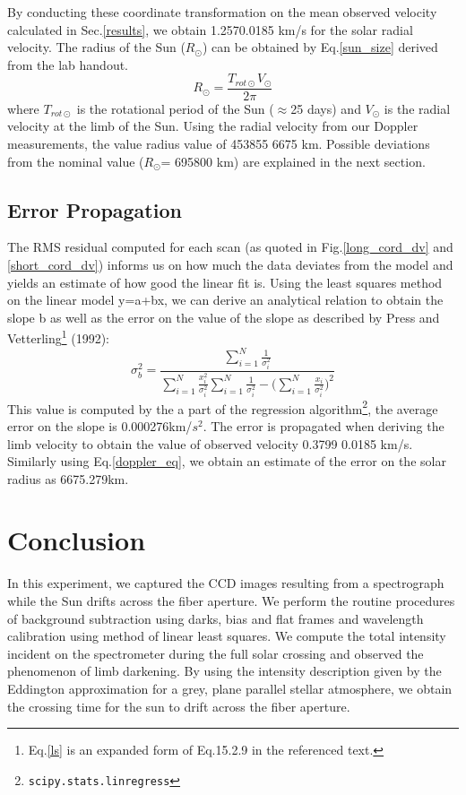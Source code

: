 \documentclass[authoryear, 12pt,5p, times]{elsarticle}
\newcommand{\rpm}{\raisebox{.3ex}{$\scriptstyle\pm$}}
\begin{document}
By conducting these coordinate transformation on the mean observed velocity calculated in Sec.\ref{results}, we obtain 1.257\rpm 0.0185 km/s for the solar radial velocity. The radius of the Sun ($R_{\odot}$) can be obtained by Eq.\ref{sun_size} derived from the lab handout.
\begin{equation}
R_{\odot} = \frac{T_{rot \odot} V_\odot}{2\pi}
\label{sun_size}
\end{equation}
where $T_{rot \odot}$ is the rotational period of the Sun ($\approx$25 days) and $V_\odot$ is the radial velocity at the limb of the Sun. Using the radial velocity from our Doppler measurements, the value radius value of 453855 \rpm 6675 km. Possible deviations from the nominal value ($R_\odot$= 695800 km) are explained in the next section.
\label{size_calc}
\subsection{Error Propagation}
The RMS residual computed for each scan (as quoted in Fig.\ref{long_cord_dv} and \ref{short_cord_dv}) informs us on how much the data  deviates from the model and yields an estimate of how good the linear fit is.  Using the least squares method on the linear model y=a+bx, we can derive an analytical relation to obtain the slope b as well as the error on the value of the slope as described by Press and Vetterling\footnote{Eq.\ref{ls} is an expanded form of  Eq.15.2.9 in the referenced text.}  (1992): 
\begin{equation}
\sigma_b^2 = \frac{\sum\limits_{i=1}^N\frac{1}{\sigma_i^2}}{\sum\limits_{i=1}^N\frac{x_i^2}{\sigma_i^2}\sum\limits_{i=1}^N\frac{1}{\sigma_i^2}-\Big(\sum\limits_{i=1}^N\frac{x_i}{\sigma_i^2}\Big)^2}
\label{ls}
\end{equation}
This value is computed by the a part of the regression algorithm\footnote{\texttt{scipy.stats.linregress}}, the average error on the slope is 0.000276km/$s^2$. The error is propagated when deriving the limb velocity to obtain the value of observed velocity  0.3799 \rpm 0.0185 km/s. Similarly using Eq.\ref{doppler_eq}, we obtain an estimate of the error on the solar radius as 6675.279km.
\section{Conclusion}
In this experiment, we captured the CCD images resulting from a spectrograph while the Sun drifts across the fiber aperture. We perform the routine procedures of background subtraction using darks, bias and flat frames and wavelength calibration using method of linear least squares. We compute the total intensity incident on the spectrometer during the full solar crossing and observed the phenomenon of limb darkening. By using the intensity description given by the Eddington approximation for a grey, plane parallel stellar atmosphere, we obtain the crossing time for the sun to drift across the fiber aperture. 
\end{document}
